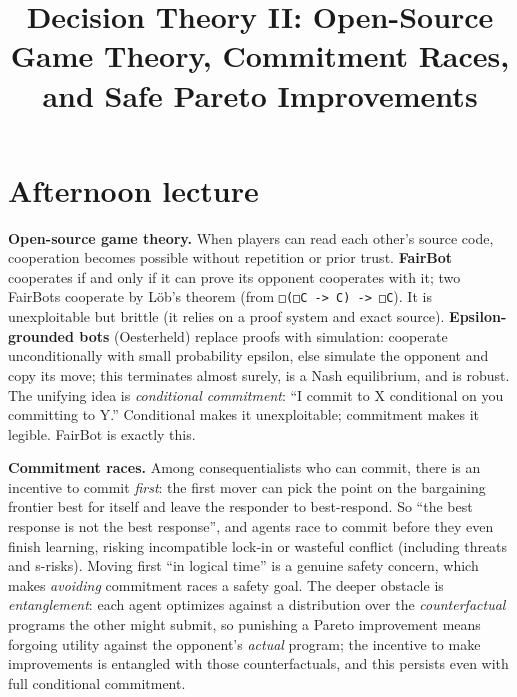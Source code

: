 \documentclass[11pt]{article}
\title{Decision Theory II: Open-Source Game Theory, Commitment Races, and Safe Pareto Improvements}
\author{
  \authorname{Daniel C}
  \and
  \authorname{Satya Benson}
}
\begin{document}
\maketitle


\section{Afternoon lecture}
\textbf{Open-source game theory.} When players can read each other's source code, cooperation becomes possible without repetition or prior trust. \textbf{FairBot} cooperates if and only if it can prove its opponent cooperates with it; two FairBots cooperate by Löb's theorem (from \texttt{□(□C\ -\textgreater{}\ C)\ -\textgreater{}\ □C}). It is unexploitable but brittle (it relies on a proof system and exact source). \textbf{Epsilon-grounded bots} (Oesterheld) replace proofs with simulation: cooperate unconditionally with small probability epsilon, else simulate the opponent and copy its move; this terminates almost surely, is a Nash equilibrium, and is robust. The unifying idea is \emph{conditional commitment}: ``I commit to X conditional on you committing to Y.'' Conditional makes it unexploitable; commitment makes it legible. FairBot is exactly this.

\textbf{Commitment races.} Among consequentialists who can commit, there is an incentive to commit \emph{first}: the first mover can pick the point on the bargaining frontier best for itself and leave the responder to best-respond. So ``the best response is not the best response'', and agents race to commit before they even finish learning, risking incompatible lock-in or wasteful conflict (including threats and s-risks). Moving first ``in logical time'' is a genuine safety concern, which makes \emph{avoiding} commitment races a safety goal. The deeper obstacle is \emph{entanglement}: each agent optimizes against a distribution over the \emph{counterfactual} programs the other might submit, so punishing a Pareto improvement means forgoing utility against the opponent's \emph{actual} program; the incentive to make improvements is entangled with those counterfactuals, and this persists even with full conditional commitment.
\end{document}
